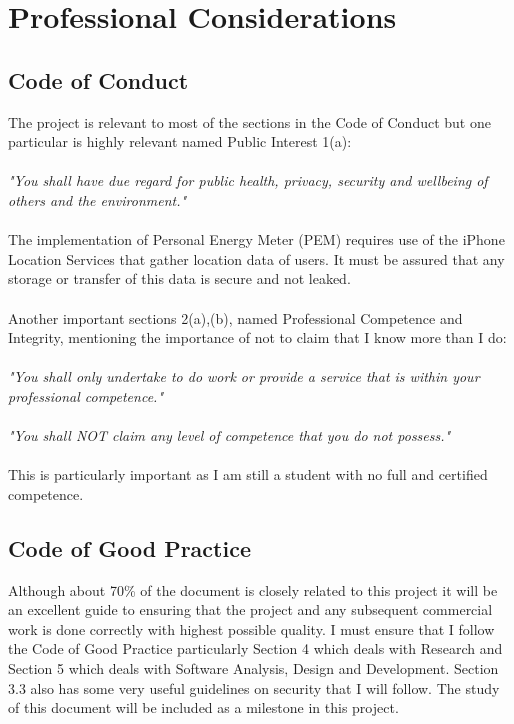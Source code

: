 \documentclass[12pt, a4paper]{report}   %
\begin{document}
\chapter{Professional Considerations}

\section{Code of Conduct}
The project is relevant to most of the sections in the Code of Conduct but one particular is highly relevant named Public Interest 1(a):\\ \\
\textit{"You shall have due regard for public health, privacy, security and wellbeing of others and the environment."}\\ \\
The implementation of Personal Energy Meter (PEM) requires use of the iPhone Location Services that gather location data of users. It must be assured that any storage or transfer of this data is secure and not leaked.\\ \\
Another important sections 2(a),(b), named Professional Competence and Integrity, mentioning the importance of not to claim that I know more than I do:\\ \\
\textit{"You shall only undertake to do work or provide a service that is within your professional competence."}\\ \\
\textit{"You shall NOT claim any level of competence that you do not possess."}\\ \\
This is particularly important as I am still a student with no full and certified competence.

\section{Code of Good Practice}
Although about 70\% of the document is closely related to this project it will be an excellent guide to ensuring that the project and any subsequent commercial work  is done correctly with highest possible quality. I must ensure that I follow the Code of Good Practice particularly Section 4 which deals with Research and Section 5 which deals with Software Analysis, Design and Development. Section 3.3 also has some very useful guidelines on security that I will follow.
The study of this document will be included as a milestone in this project.
\end{document}
